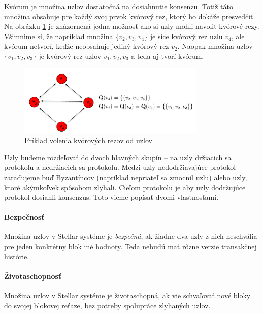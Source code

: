 \begin{flushleft}
Kvórum je množina uzlov dostatočná na dosiahnutie konsenzu. Totiž táto množina obsahuje
pre každý svoj prvok kvórový rez, ktorý ho dokáže presvedčiť.
Na obrázku \ref{obr:kvorum} je znázornená jedna možnosť ako si uzly mohli navoliť
kvórové rezy.
Všimnime si, že napríklad množina $\{v_2, v_3, v_4\}$ je síce kvórový rez uzlu
$v_4$, ale kvórum netvorí, keďže neobsahuje jediný kvórový rez $v_2$.
Naopak množina uzlov $\{v_1, v_2, v_3\}$ je kvórový rez uzlov $v_1, v_2, v_3$ a
teda aj tvorí kvórum.

\begin{figure}
\centerline{\includegraphics[width=0.8\textwidth]{images/kvorum.pdf}}
\caption[Príklad siete]{Príklad volenia kvórových rezov od uzlov} \label{obr:kvorum}
\end{figure}

\end{flushleft}

Uzly budeme rozdeľovať do dvoch hlavných skupín -- na uzly držiacich sa protokolu a
nedržiacich sa protokolu. Medzi uzly nedodržiavajúce protokol zaraďujeme buď
Byzantíncov (napríklad nepriateľ sa zmocnil uzlu) alebo uzly, ktoré akýmkoľvek
spôsobom zlyhali.
Cieľom protokolu je aby uzly dodržujúce protokol dosiahli konsenzus. Toto vieme
popísať dvomi vlastnosťami.

\paragraph {Bezpečnosť} Množina uzlov v Stellar systéme je \textit{bezpečná}, ak žiadne
dva uzly z nich neschvália pre jeden konkrétny blok iné hodnoty. Teda nebudú mať
rôzne verzie transakčnej histórie.

\paragraph {Životaschopnosť} Množina uzlov v Stellar systéme je životaschopná,
ak vie schvaľovať nové bloky do svojej blokovej reťaze, bez potreby spolupráce
zlyhaných uzlov.

